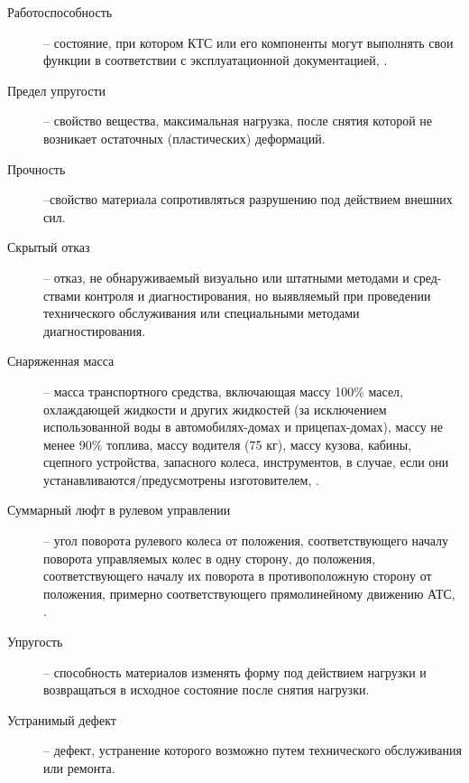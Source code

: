 \begin{description}
\item
[Работоспособность] -- состояние, при котором КТС или его компоненты могут выполнять свои функции в соответствии с эксплуатационной документацией, \cite[п.2.49]{33997:gost}.
	\item
	[Предел упругости ] -- свойство вещества, максимальная нагрузка, после снятия которой не возникает остаточных (пластических) деформаций.
	\item
	[Прочность] --свойство материала сопротивляться разрушению под действием внешних сил.
	\item
	[Скрытый отказ] -- отказ, не обнаруживаемый визуально или штатными методами и сред-ствами контроля и диагностирования, но выявляемый при проведении технического обслуживания или специальными методами диагностирования.
	\item[Снаряженная масса] -- масса транспортного средства, включающая массу 100\% масел, охлаждающей жидкости и других жидкостей (за исключением использованной воды в автомобилях-домах и прицепах-домах), массу не менее 90\% топлива, массу водителя (75 кг), массу кузова, кабины, сцепного устройства, запасного колеса, инструментов, в случае, если они устанавливаются/предусмотрены изготовителем,  \cite{33987:gost}.
	\item[Суммарный люфт в рулевом управлении] -- угол поворота рулевого колеса от положения, соответствующего началу поворота управляемых колес в одну сторону, до положения, соответствующего началу их поворота в противоположную сторону от положения, примерно соответствующего прямолинейному движению АТС, \cite[п.2.66 ]{33997:gost}.
	\item
	[Упругость] --  способность  материалов  изменять форму  под  действием  нагрузки  и  возвращаться  в исходное состояние после снятия нагрузки.
	\item
	[Устранимый дефект] -- дефект, устранение которого возможно путем технического
	обслуживания или ремонта.
	

\end{description}
